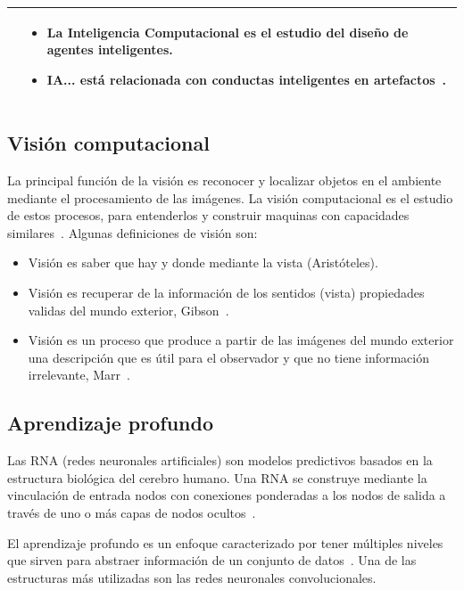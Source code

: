 \begin{table}[H]
\begin{tabular}{|M{0.45\textwidth}|M{0.45\textwidth}|}
\begin{itemize}
 \end{itemize}
&
\begin{itemize}
 \item La Inteligencia Computacional es el estudio del diseño de agentes inteligentes.~\cite{poole1998computational}
 \item IA... está relacionada con conductas inteligentes en artefactos~\cite{nilsson1998artificial}.
\end{itemize}

 \\ 
\hline
\end{tabular}%

\label{tab:addlabel}%
\end{table}%
\subsection{Visión computacional}
La principal función de la visión es reconocer y localizar objetos en el ambiente mediante el procesamiento de las imágenes. La visión computacional es el estudio de estos procesos, para entenderlos y construir maquinas con capacidades similares~\cite{sucar2011vision}.
Algunas definiciones de visión son:
\begin{itemize}
  \item Visión es saber que hay y donde mediante la vista (Aristóteles).
  \item Visión es recuperar de la información de los sentidos (vista) propiedades validas del mundo exterior, Gibson~\cite{gibson2014ecological}.
  \item  Visión es un proceso que produce a partir de las imágenes del mundo exterior una descripción que es útil para el observador y que no tiene información irrelevante, Marr~\cite{marr1982vision}.
\end{itemize}
\subsection{Aprendizaje profundo}
Las RNA (redes neuronales artificiales) son modelos predictivos basados en la estructura biológica del cerebro humano. Una RNA se construye mediante la vinculación de entrada nodos con conexiones ponderadas a los nodos de salida a través de uno o más
capas de nodos ocultos~\cite{rumelhart1986learning}.


El aprendizaje profundo es un enfoque caracterizado por tener múltiples niveles que sirven para abstraer información de un conjunto de datos~\cite{lecun2015deep}. Una de las estructuras más utilizadas son las redes neuronales convolucionales.


